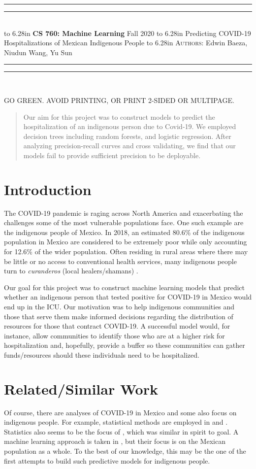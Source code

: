 \documentclass{article}
\newcommand{\lecture}[2]{
\pagestyle{myheadings}
\thispagestyle{plain}
\newpage
\noindent
\begin{center}
\rule{\textwidth}{1.6pt}\vspace*{-\baselineskip}\vspace*{2pt} %
\rule{\textwidth}{0.4pt}\\[1\baselineskip] %
\vbox{\vspace{2mm}
\hbox to 6.28in { {\bf CS 760: Machine Learning} \hfill Fall 2020 }
\vspace{4mm}
\hbox to 6.28in { {\Large \hfill #1  \hfill} }
\vspace{4mm}
\hbox to 6.28in { {\scshape Authors:}  #2 \hfill }}
\vspace{-2mm}
\rule{\textwidth}{0.4pt}\vspace*{-\baselineskip}\vspace{3.2pt} %
\rule{\textwidth}{1.6pt}\\[\baselineskip] %
\end{center}
\vspace*{4mm}
}
\begin{document}
\lecture{Predicting COVID-19 Hospitalizations of Mexican Indigenous People}{Edwin Baeza, Niudun Wang, Yu Sun}

\begin{center}
{\Large {\sf GO GREEN. AVOID PRINTING, OR PRINT 2-SIDED OR MULTIPAGE.}}
\end{center}

\begin{abstract}
Our aim for this project was to construct models to predict the hospitalization of an indigenous person due to Covid-19. We employed decision trees including random forests, and logistic regression. After analyzing precision-recall curves and cross validating, we find that our models fail to provide sufficient precision to be deployable.      

 

\end{abstract}

\section{Introduction}
The COVID-19 pandemic is raging across North America and exacerbating the challenges some of the most vulnerable populations face. One such example are the indigenous people of Mexico. In 2018, an estimated 80.6\% of the indigenous population in Mexico are considered to be extremely poor while only accounting for 12.6\% of the wider population. Often residing in rural areas where there may be little or no access to conventional health services, many indigenous people turn to \emph{curanderos} (local healers/shamans) \cite{un}.     

Our goal for this project was to construct machine learning models that predict whether an indigenous person that tested positive for COVID-19 in Mexico would end up in the ICU. Our motivation was to help indigenous communities and those that serve them make informed decisions regarding the distribution of  resources for those that contract COVID-19. A successful model would, for instance, allow communities to identify those who are at a higher risk for hospitalization and, hopefully, provide a buffer so these communities can gather funds/resources should these individuals need to be hospitalized.      


\section{Related/Similar Work}
Of course, there are analyses of COVID-19 in Mexico and some also focus on indigenous people. For example, statistical methods are employed in \cite{survival_analysis} and \cite{demo_comorbid}. Statistics also seems to be the focus of \cite{impact}, which was similar in spirit to goal. A machine learning approach is taken in  \cite{predictive_models}, but their focus is on the Mexican population as a whole. To the best of our knowledge, this may be the one of the first attempts to build such predictive models for indigenous people.   
\end{document}
